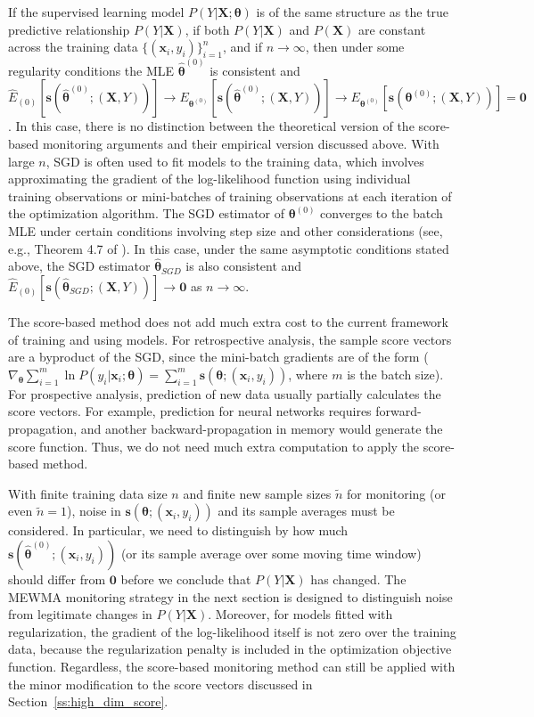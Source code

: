 \documentclass[twoside,11pt]{article}
\begin{document}
If the supervised learning model $P(Y|\bm{X};\bm{\theta})$ is of the same structure as the true predictive relationship $P(Y|\bm{X})$, if both $P(Y|\bm{X})$ and $P(\bm{X})$ are constant across the training data $\{(\bm{x}_i, y_i)\}_{i=1}^n$, and if $n \to \infty$, then under some regularity conditions the MLE $\hat{\bm { \theta}} ^{ (0)}$ is consistent and  $\hat{E}_{(0)} [\bm{s}(\hat{\bm { \theta}} ^{ (0)};(\bm {X}, Y))] \to E_{\bm { \theta} ^{ (0)}}[\bm{s}(\hat{\bm { \theta}} ^{ (0)};(\bm {X}, Y))] \to E_{\bm { \theta} ^{ (0)}}[\bm{s}(\bm { \theta} ^{ (0)};(\bm {X}, Y))] = \bm {0}$. In this case, there is no distinction between the theoretical version of the score-based monitoring arguments and their empirical version discussed above. With large $n$, SGD is often used to fit models to the training data, which involves approximating the gradient of the log-likelihood function using individual training observations or mini-batches of training observations at each iteration of the optimization algorithm. The SGD estimator of $\bm { \theta} ^{ (0)}$ converges to the batch MLE under certain conditions involving step size and other considerations (see, e.g., Theorem 4.7 of \cite{bottou2018optimization}). In this case, under the same asymptotic conditions stated above, the SGD estimator $\hat {\bm { \theta}}_{SGD}$ is also consistent and $\hat{E}_{(0)} [\bm{s}(\hat{\bm { \theta}}_{SGD};(\bm {X}, Y))] \to \bm{0}$ as $n \to \infty$. 

The score-based method does not add much extra cost to the current framework of training and using models. For retrospective analysis, the sample score vectors are a byproduct of the SGD, since the mini-batch gradients are of the form ($\nabla _{\bm { \theta}} \sum _{i=1} ^{m} \ln P(y_i|\bm {x}_i;\bm{\theta}) = \sum _{i=1} ^{m} \bm{s}(\bm { \theta};(\bm {x}_i, y_i))$, where $m$ is the batch size). For prospective analysis, prediction of new data usually partially calculates the score vectors. For example, prediction for neural networks requires forward-propagation, and another backward-propagation in memory would generate the score function. Thus, we do not need much extra computation to apply the score-based method.

With finite training data size $n$ and finite new sample sizes $\tilde{n}$ for monitoring (or even $\tilde{n}=1$), noise in $\bm{s}(\bm { \theta};(\bm {x}_i, y_i))$ and its sample averages must be considered. In particular, we need to distinguish by how much $\bm{s}(\hat{\bm { \theta}}^{(0)};(\bm {x}_i, y_i))$ (or its sample average over some moving time window) should differ from $\bm{0}$ before we conclude that $P(Y|\bm{X})$ has changed. The MEWMA monitoring strategy in the next section is designed to distinguish noise from legitimate changes in $P(Y|\bm{X})$. Moreover, for models fitted with regularization, the gradient of the log-likelihood itself is not zero over the training data, because the regularization penalty is included in the optimization objective function. Regardless, the score-based monitoring method can still be applied with the minor modification to the score vectors discussed in Section~\ref{ss:high_dim_score}.
\end{document}
